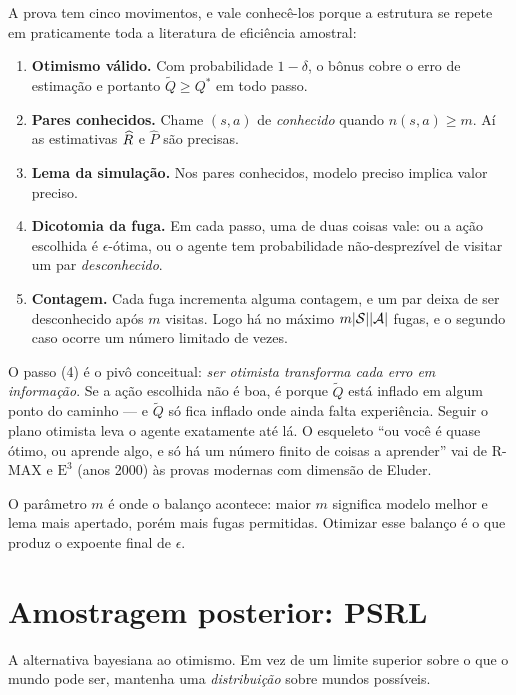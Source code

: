\documentclass[11pt, a4paper]{article}
\newcommand{\Qtil}{\widetilde{Q}}
\newcommand{\Rhat}{\widehat{\rec}}
\newcommand{\That}{\widehat{P}}
\newcommand{\Qstar}{Q^{*}}
\begin{document}
A prova tem cinco movimentos, e vale conhecê-los porque a estrutura se repete em
praticamente toda a literatura de eficiência amostral:

\begin{enumerate}
  \item \textbf{Otimismo válido.} Com probabilidade $1-\delta$, o bônus cobre o erro de
        estimação e portanto $\Qtil \ge \Qstar$ em todo passo.
  \item \textbf{Pares conhecidos.} Chame $(s,a)$ de \emph{conhecido} quando
        $n(s,a) \ge m$. Aí as estimativas $\Rhat$ e $\That$ são precisas.
  \item \textbf{Lema da simulação.} Nos pares conhecidos, modelo preciso implica valor
        preciso.
  \item \textbf{Dicotomia da fuga.} Em cada passo, uma de duas coisas vale: ou a ação
        escolhida é $\epsilon$-ótima, ou o agente tem probabilidade não-desprezível de
        visitar um par \emph{desconhecido}.
  \item \textbf{Contagem.} Cada fuga incrementa alguma contagem, e um par deixa de ser
        desconhecido após $m$ visitas. Logo há no máximo $m\lvert\mathcal{S}\rvert\lvert\mathcal{A}\rvert$ fugas, e o
        segundo caso ocorre um número limitado de vezes.
\end{enumerate}

\begin{ideiabox}
O passo (4) é o pivô conceitual: \emph{ser otimista transforma cada erro em informação}.
Se a ação escolhida não é boa, é porque $\Qtil$ está inflado em algum ponto do caminho ---
e $\Qtil$ só fica inflado onde ainda falta experiência. Seguir o plano otimista leva o
agente exatamente até lá. O esqueleto ``ou você é quase ótimo, ou aprende algo, e só há um
número finito de coisas a aprender'' vai de R-MAX e $\text{E}^3$ (anos 2000) às provas
modernas com dimensão de Eluder.
\end{ideiabox}

O parâmetro $m$ é onde o balanço acontece: maior $m$ significa modelo melhor e lema mais
apertado, porém mais fugas permitidas. Otimizar esse balanço é o que produz o expoente
final de $\epsilon$.

\section{Amostragem posterior: PSRL}

A alternativa bayesiana ao otimismo. Em vez de um limite superior sobre o que o mundo pode
ser, mantenha uma \emph{distribuição} sobre mundos possíveis.
\end{document}
